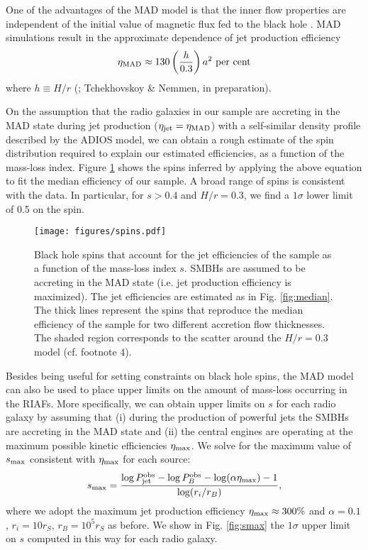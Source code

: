 \documentclass[useAMS,usenatbib]{mn2e}
\begin{document}
One of the advantages of the MAD model is that the inner flow properties are independent of the initial value of magnetic flux fed to the black hole \citep{Sasha12,Sasha12rev}. MAD simulations result in the approximate dependence of jet production efficiency  
\begin{equation}	\label{eq:mad}
\eta_{\rm MAD} \approx 130 \left( \frac{h}{0.3} \right) a^2 \ {\rm per \ cent}
\end{equation}
where $h \equiv H/r$ (\citealt{Sasha12,sasha15}; Tchekhovskoy \& Nemmen, in preparation). 

On the assumption that the radio galaxies in our sample are accreting in the MAD state during jet production ($\eta_{\rm jet} = \eta_{\rm MAD}$) with a self-similar density profile described by the ADIOS model, we can obtain a rough estimate of the spin distribution required to explain our estimated efficiencies, as a function of the mass-loss index. Figure \ref{fig:spins} shows the spins inferred by applying the above equation to fit the median efficiency of our sample. A broad range of spins is consistent with the data. In particular, for $s>0.4$ and $H/r=0.3$, we find a $1\sigma$ lower limit of 0.5 on the spin. 

\begin{figure}
\centering
\texttt{[image: figures/spins.pdf]}
\caption{Black hole spins that account for the jet efficiencies of the sample as a function of the mass-loss index $s$. SMBHs are assumed to be accreting in the MAD state (i.e. jet production efficiency is maximized). The jet efficiencies are estimated as in Fig. \ref{fig:median}. The thick lines represent the spins that reproduce the median efficiency of the sample for two different accretion flow thicknesses. The shaded region corresponds to the scatter around the $H/r=0.3$ model (cf. footnote 4).}
\label{fig:spins}
\end{figure}

Besides being useful for setting constraints on black hole spins, the MAD model can also be used to place upper limits on the amount of mass-loss occurring in the RIAFs. More specifically, we can obtain upper limits on $s$ for each radio galaxy by assuming that (i) during the production of powerful jets the SMBHs are accreting in the MAD state and (ii) the central engines are operating at the maximum possible kinetic efficiencies $\eta_{\rm max}$. We solve for the maximum value of $s_{\rm max}$ consistent with $\eta_{\rm max}$ for each source:
\begin{equation}
s_{\rm max} = \frac{ \log P_{\rm jet}^{\rm obs} -\log P_B^{\rm obs} -\log (\alpha \eta_{\rm max}) -1}{\log (r_i/r_B)},
\end{equation}
where we adopt the maximum jet production efficiency $\eta_{\rm max} \approx 300\%$ \citep{Sasha12,McKinney12} and $\alpha=0.1$, $r_i=10 r_S$, $r_B=10^5 r_S$ as before. We show in Fig. \ref{fig:smax} the $1\sigma$ upper limit on $s$ computed in this way for each radio galaxy.  
\end{document}
